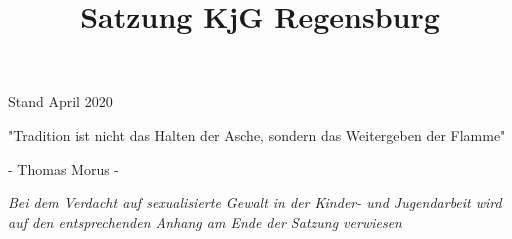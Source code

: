 \documentclass[12pt]{report}
\title{Satzung KjG Regensburg}
\author{}
\begin{document}
  \maketitle
  \begin{center}
    \pagestyle{empty}
    \BgThispage
    \vspace*{\fill}
    \begin{Huge}
      { \color{kjgtuerkis}  Stand April 2020}
    \end{Huge}
    \vspace*{\fill}
    \newpage
    \pagestyle{empty}
    \vspace*{\fill}
   { \selectfont
     \begin{Huge}
     "Tradition ist nicht das Halten der Asche, sondern das Weitergeben der Flamme"
     \end{Huge}
    }
    \newline
    \begin{large}
      - Thomas Morus -
    \end{large}
    \vspace*{\fill}
  \end{center}

  \tableofcontents
  \begin{flushleft}
   \it{ Bei dem Verdacht auf sexualisierte Gewalt in der Kinder- und Jugendarbeit wird auf den entsprechenden
        Anhang am Ende der Satzung verwiesen}
  \end{flushleft}
  \newpage  
  \setcounter{page}{1}
\end{document}
